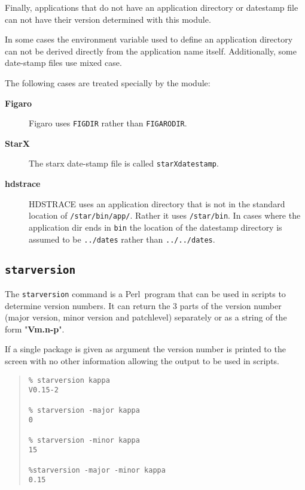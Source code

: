 \documentclass[twoside,11pt]{article}
\newenvironment{myquote}{\begin{quote}\begin{small}}{\end{small}\end{quote}}
\newcommand{\perl}{\xref{\textsf{Perl}}{sun193}{}}
\newcommand{\xref}[3]{#1}
\renewcommand{\_}{\texttt{\symbol{95}}}
\begin{document}
Finally, applications that do not have an application directory
or datestamp file can not have their version determined with this module.

In some cases the environment variable used to define an application
directory can not be derived directly from the application name
itself. Additionally, some date-stamp files use mixed case.

The following cases are treated specially by the module:

\begin{description}
\item[\textbf{Figaro}] \mbox{}

Figaro uses \texttt{FIG\_DIR} rather than \texttt{FIGARO\_DIR}.

\item[\textbf{StarX}] \mbox{}

The starx date-stamp file is called \texttt{starX\_datestamp}.

\item[\textbf{hdstrace}] \mbox{}

HDSTRACE uses an application directory that is not in the
standard location of \texttt{/star/bin/app/}. Rather it uses
\texttt{/star/bin}. In cases where the application dir ends in
\texttt{bin} the location of the datestamp directory is assumed
to be \texttt{../dates} rather than \texttt{../../dates}.

\end{description}

\subsection{\texttt{starversion}}

The \texttt{starversion} command is a \perl\ program that can be used in scripts
to determine version numbers.  It can return the 3 parts of the version number
(major version, minor version and patchlevel) separately or as a string of the
form "\textbf{Vm.n-p}". 

If a single package is given as argument the version number is printed to the
screen with no other information allowing the output to be used in scripts.


\begin{myquote}
\begin{verbatim}
% starversion kappa
V0.15-2

% starversion -major kappa
0

% starversion -minor kappa
15

%starversion -major -minor kappa
0.15
\end{verbatim}
\end{myquote}
\end{document}
